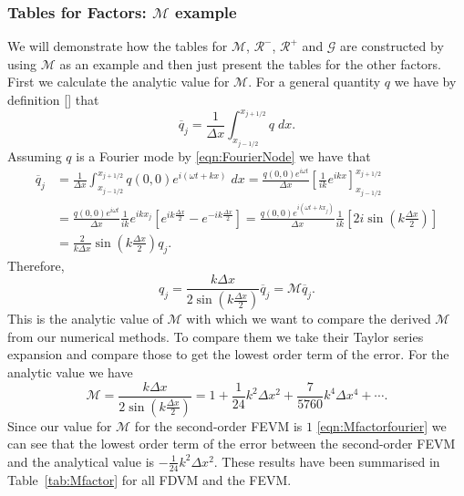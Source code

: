 \subsubsection{Tables for Factors: $\mathcal{M}$ example} 
We will demonstrate how the tables for $\mathcal{M}$, $\mathcal{R}^-$, $\mathcal{R}^+$ and $\mathcal{G}$ are constructed by using $\mathcal{M}$ as an example and then just present the tables for the other factors. First we calculate the analytic value for $\mathcal{M}$. For a general quantity $q$ we have by definition [] that
\begin{equation*}
\overline{q}_j = \frac{1}{\Delta x} \int_{x_{j-1/2}}^{x_{j+1/2}} q \; dx.
\end{equation*}
Assuming $q$ is a Fourier mode by \eqref{eqn:FourierNode} we have that
\begin{align*}
\overline{q}_j &= \frac{1}{\Delta x} \int_{x_{j-1/2}}^{x_{j+1/2}} q(0,0) e^{i\left(\omega t + kx\right)} \; dx = \frac{q(0,0)e^{i \omega  t}}{\Delta x} \left[\frac{1}{ik} e^{ikx}\right]_{x_{j-1/2}}^{x_{j+1/2}} \\
&= \frac{q(0,0)e^{i \omega  t}}{\Delta x} \frac{1}{ik} e^{ikx_j} \left[ e^{ik\frac{\Delta x}{2}} - e^{-ik\frac{\Delta x}{2}}\right] = \frac{q(0,0)e^{i \left(\omega  t + kx_j \right)}}{\Delta x} \frac{1}{ik} \left[ 2 i \sin \left(k\frac{\Delta x}{2}\right)\right]\\
&=  \frac{2}{k\Delta x} \sin \left(k\frac{\Delta x}{2}\right) q_j.
\end{align*}
Therefore,
\begin{equation}
q_j =  \frac{k\Delta x}{2 \sin \left(k\frac{\Delta x}{2}\right)  } \overline{q}_j = \mathcal{M}  \overline{q}_j.
\end{equation}
This is the analytic value of $\mathcal{M}$ with which we want to compare the derived $\mathcal{M}$ from our numerical methods. To compare them we take their Taylor series expansion and compare those to get the lowest order term of the error. For the analytic value we have
\begin{equation}
\mathcal{M} = \frac{k\Delta x}{2 \sin \left(k\frac{\Delta x}{2}\right)  } = 1 + \frac{1}{24} k^2 \Delta x^2 + \frac{7}{5760}k^4\Delta x ^4 + \cdots.
\end{equation}
Since our value for $\mathcal{M}$ for the second-order FEVM is $1$ \eqref{eqn:Mfactorfourier} we can see that the lowest order term of the error between the second-order FEVM and the analytical value is $-\frac{1}{24} k^2 \Delta x^2$. These results have been summarised in Table~\ref{tab:Mfactor} for all FDVM and the FEVM. 

